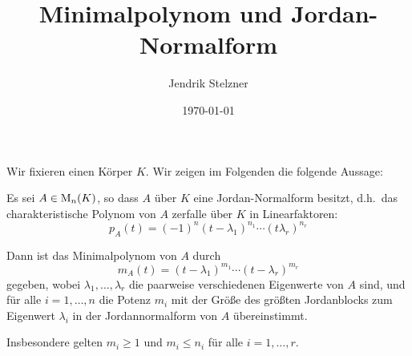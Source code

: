 \documentclass[a4paper,10pt]{scrartcl}
\title{Minimalpolynom und Jordan-Normalform}
\author{Jendrik Stelzner}
\date{\today}
\begin{document}
\maketitle

Wir fixieren einen Körper $K$.
Wir zeigen im Folgenden die folgende Aussage:

\begin{theorem}
  \label{theorem: minimalpolynomial}
  Es sei $A \in \operatorname{M}_{n}(K)$, so dass $A$ über $K$ eine Jordan-Normalform besitzt, d.h.\ das charakteristische Polynom von $A$ zerfalle über $K$ in Linearfaktoren:
  \[
    p_A(t) = (-1)^n (t - \lambda_1)^{n_1} \dotsm (t  \lambda_r)^{n_r}
  \]
  
  Dann ist das Minimalpolynom von $A$ durch
  \[
      m_A(t)
    = (t - \lambda_1)^{m_1} \dotsm (t - \lambda_r)^{m_r}
  \]
  gegeben, wobei $\lambda_1, \dotsc, \lambda_r$ die paarweise verschiedenen Eigenwerte von $A$ sind, und für alle $i = 1, \dotsc, n$ die Potenz $m_i$ mit der Größe des größten Jordanblocks zum Eigenwert $\lambda_i$ in der Jordannormalform von $A$ übereinstimmt.
  
  Insbesondere gelten $m_i \geq 1$ und $m_i \leq n_i$ für alle $i = 1, \dotsc, r$.
\end{theorem}
\end{document}
